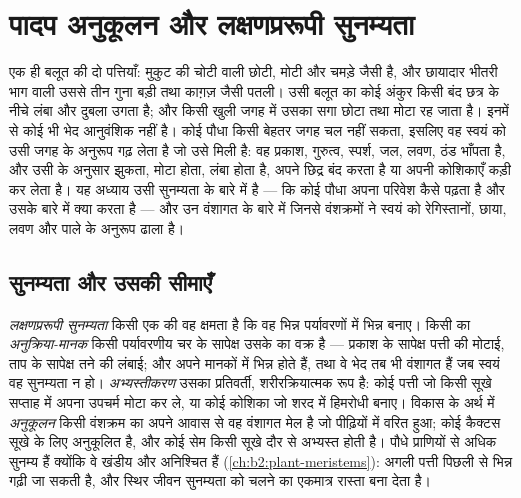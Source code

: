 \chapter{पादप अनुकूलन और लक्षणप्ररूपी सुनम्यता}\label{ch:b2:plant-plasticity}

एक ही बलूत की दो पत्तियाँ: मुकुट की चोटी वाली छोटी, मोटी और चमड़े जैसी
है, और छायादार भीतरी भाग वाली उससे तीन गुना बड़ी तथा काग़ज़ जैसी पतली।
उसी बलूत का कोई अंकुर किसी बंद छत्र के नीचे लंबा और दुबला उगता है; और
किसी खुली जगह में उसका सगा छोटा तथा मोटा रह जाता है। इनमें से कोई भी भेद
आनुवंशिक नहीं है। कोई पौधा किसी बेहतर जगह चल नहीं सकता, इसलिए वह स्वयं को
उसी जगह के अनुरूप गढ़ लेता है जो उसे मिली है: वह प्रकाश, गुरुत्व, स्पर्श,
जल, लवण, ठंड भाँपता है, और उसी के अनुसार झुकता, मोटा होता, लंबा होता है,
अपने छिद्र बंद करता है या अपनी कोशिकाएँ कड़ी कर लेता है। यह अध्याय उसी
सुनम्यता के बारे में है --- कि कोई पौधा अपना परिवेश कैसे पढ़ता है और उसके
बारे में क्या करता है --- और उन वंशागत  के बारे में
जिनसे वंशक्रमों ने स्वयं को रेगिस्तानों, छाया, लवण और पाले के अनुरूप ढाला है।

\section{सुनम्यता और उसकी सीमाएँ}

\begin{definition}[लक्षणप्ररूपी सुनम्यता और अनुक्रिया-मानक]\label{def:b2:plant-plasticity:plasticity}
\emph{लक्षणप्ररूपी सुनम्यता} किसी एक  की वह क्षमता है कि वह
भिन्न पर्यावरणों में भिन्न  बनाए। किसी  का
\emph{अनुक्रिया-मानक} किसी पर्यावरणीय चर के सापेक्ष उसके  का
वक्र है --- प्रकाश के सापेक्ष पत्ती की मोटाई, ताप के सापेक्ष तने की
लंबाई; और  अपने मानकों में भिन्न होते हैं,
तथा वे भेद तब भी वंशागत हैं जब स्वयं वह सुनम्यता न हो।
\emph{अभ्यस्तीकरण} उसका प्रतिवर्ती, शरीरक्रियात्मक रूप है:
कोई पत्ती जो किसी सूखे सप्ताह में अपना उपचर्म मोटा कर ले, या कोई कोशिका
जो शरद में हिमरोधी बनाए। विकास के अर्थ में \emph{अनुकूलन}
किसी वंशक्रम का अपने आवास से वह वंशागत मेल है जो पीढ़ियों में
वरित हुआ; कोई कैक्टस सूखे के लिए अनुकूलित है, और कोई सेम किसी
सूखे दौर से अभ्यस्त होती है। पौधे प्राणियों से अधिक सुनम्य हैं क्योंकि वे
खंडीय और अनिश्चित हैं (\cref{ch:b2:plant-meristems}): अगली
पत्ती पिछली से भिन्न गढ़ी जा सकती है, और स्थिर जीवन
सुनम्यता को चलने का एकमात्र रास्ता बना देता है।
\end{definition}

